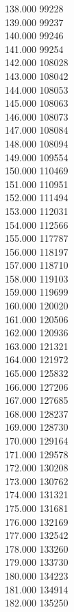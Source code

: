 { 138.000	99228 \\
 139.000	99237 \\
 140.000	99246 \\
 141.000	99254 \\
 142.000	108028 \\
 143.000	108042 \\
 144.000	108053 \\
 145.000	108063 \\
 146.000	108073 \\
 147.000	108084 \\
 148.000	108094 \\
 149.000	109554 \\
 150.000	110469 \\
 151.000	110951 \\
 152.000	111494 \\
 153.000	112031 \\
 154.000	112566 \\
 155.000	117787 \\
 156.000	118197 \\
 157.000	118710 \\
 158.000	119103 \\
 159.000	119699 \\
 160.000	120020 \\
 161.000	120506 \\
 162.000	120936 \\
 163.000	121321 \\
 164.000	121972 \\
 165.000	125832 \\
 166.000	127206 \\
 167.000	127685 \\
 168.000	128237 \\
 169.000	128730 \\
 170.000	129164 \\
 171.000	129578 \\
 172.000	130208 \\
 173.000	130762 \\
 174.000	131321 \\
 175.000	131681 \\
 176.000	132169 \\
 177.000	132542 \\
 178.000	133260 \\
 179.000	133730 \\
 180.000	134223 \\
 181.000	134914 \\
 182.000	135250 \\
}
